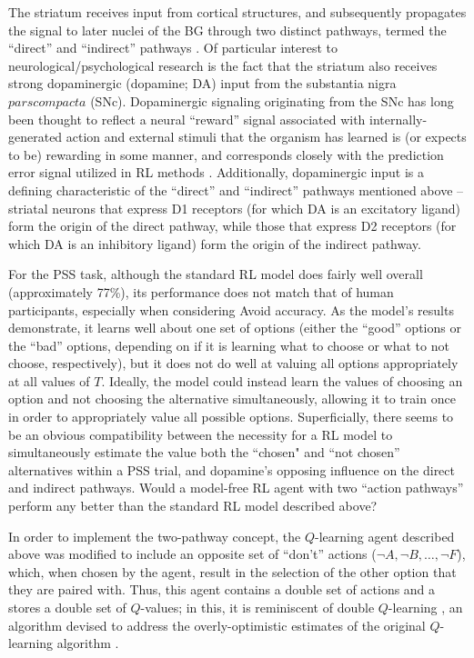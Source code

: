 \documentclass[10pt,letterpaper]{article}
\begin{document}
The striatum receives input from cortical structures, and subsequently propagates the signal to later nuclei of the BG through two distinct pathways, termed the ``direct'' and ``indirect'' pathways \cite{smith1998microcircuitry}. Of particular interest to neurological/psychological research is the fact that the striatum also receives strong dopaminergic (dopamine; DA) input from the substantia nigra $pars compacta$ (SNc). Dopaminergic signaling originating from the SNc has long been thought to reflect a neural ``reward'' signal associated with internally-generated action and external stimuli that the organism has learned is (or expects to be) rewarding in some manner, and corresponds closely with the prediction error signal utilized in RL methods \cite{schultz2000multuple, schultz1997neural}. Additionally, dopaminergic input is a defining characteristic of the ``direct'' and ``indirect'' pathways mentioned above -- striatal neurons that express D1 receptors (for which DA is an excitatory ligand) form the origin of the direct pathway, while those that express D2 receptors (for which DA is an inhibitory ligand) form the origin of the indirect pathway.

For the PSS task, although the standard RL model does fairly well overall (approximately 77\%), its performance does not match that of human participants, especially when considering Avoid accuracy. As the model's results demonstrate, it learns well about one set of options (either the ``good'' options or the ``bad'' options, depending on if it is learning what to choose or what to not choose, respectively), but it does not do well at valuing all options appropriately at all values of $T$. Ideally, the model could instead learn the values of choosing an option and not choosing the alternative simultaneously, allowing it to train once in order to appropriately value all possible options. Superficially, there seems to be an obvious compatibility between the necessity for a RL model to simultaneously estimate the value both the ``chosen" and ``not chosen'' alternatives within a PSS trial, and dopamine's opposing influence on the direct and indirect pathways. Would a model-free RL agent with two ``action pathways'' perform any better than the standard RL model described above?

In order to implement the two-pathway concept, the $Q$-learning agent described above was modified to include an opposite set of ``don't'' actions ($\neg A, \neg B, \dots, \neg F$), which, when chosen by the agent, result in the selection of the other option that they are paired with. Thus, this agent contains a double set of actions and a stores a double set of $Q$-values; in this, it is reminiscent of double $Q$-learning \cite{hasselt2010double,van2016deep}, an algorithm devised to address the overly-optimistic estimates of the original $Q$-learning algorithm \cite{watkins1992q}.
\end{document}
